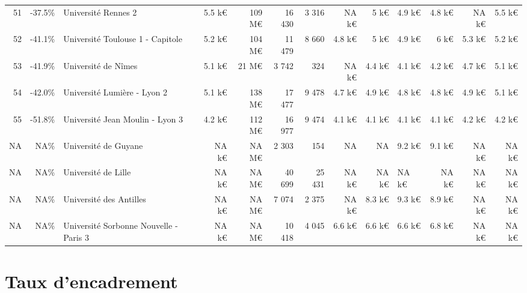 \documentclass[11pt,french,landscape]{article}
\begin{document}
\begin{longtable}{rrlrrrrrrlrrr}
\rowcolor{gray!6}  51 & -37.5\% & Université Rennes 2 & 5.5 k€ & 109 M€ & 16 430 & 3 316 & NA k€ & 5 k€ & 4.9 k€ & 4.8 k€ & NA k€ & 5.5 k€\\
52 & -41.1\% & Université Toulouse 1 - Capitole & 5.2 k€ & 104 M€ & 11 479 & 8 660 & 4.8 k€ & 5 k€ & 4.9 k€ & 6 k€ & 5.3 k€ & 5.2 k€\\
\rowcolor{gray!6}  53 & -41.9\% & Université de Nîmes & 5.1 k€ & 21 M€ & 3 742 & 324 & NA k€ & 4.4 k€ & 4.1 k€ & 4.2 k€ & 4.7 k€ & 5.1 k€\\
54 & -42.0\% & Université Lumière - Lyon 2 & 5.1 k€ & 138 M€ & 17 477 & 9 478 & 4.7 k€ & 4.9 k€ & 4.8 k€ & 4.8 k€ & 4.9 k€ & 5.1 k€\\
\rowcolor{gray!6}  55 & -51.8\% & Université Jean Moulin - Lyon 3 & 4.2 k€ & 112 M€ & 16 977 & 9 474 & 4.1 k€ & 4.1 k€ & 4.1 k€ & 4.1 k€ & 4.2 k€ & 4.2 k€\\
\addlinespace
NA & NA\% & Université de Guyane & NA k€ & NA M€ & 2 303 & 154 & NA & NA & 9.2 k€ & 9.1 k€ & NA k€ & NA k€\\
\rowcolor{gray!6}  NA & NA\% & Université de Lille & NA k€ & NA M€ & 40 699 & 25 431 & NA k€ & NA k€ & NA k€ & NA k€ & NA k€ & NA k€\\
NA & NA\% & Université des Antilles & NA k€ & NA M€ & 7 074 & 2 375 & NA k€ & 8.3 k€ & 9.3 k€ & 8.9 k€ & NA k€ & NA k€\\
\rowcolor{gray!6}  NA & NA\% & Université Sorbonne Nouvelle - Paris 3 & NA k€ & NA M€ & 10 418 & 4 045 & 6.6 k€ & 6.6 k€ & 6.6 k€ & 6.8 k€ & NA k€ & NA k€\\*
\end{longtable}

\newpage

\hypertarget{taux-dencadrement}{%
\section{Taux d'encadrement}\label{taux-dencadrement}}
\end{document}
